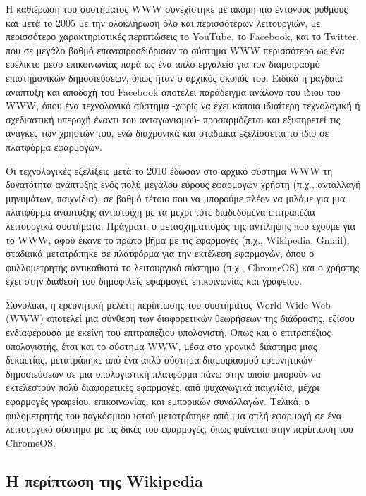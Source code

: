 \documentclass[
]{article}
\begin{document}
Η καθιέρωση του συστήματος WWW συνεχίστηκε με ακόμη πιο έντονους ρυθμούς
και μετά το 2005 με την ολοκλήρωση όλο και περισσότερων λειτουργιών, με
περισσότερο χαρακτηριστικές περιπτώσεις το YouTube, το Facebook, και το
Twitter, που σε μεγάλο βαθμό επαναπροσδιόρισαν το σύστημα WWW
περισσότερο ως ένα ευέλικτο μέσο επικοινωνίας παρά ως ένα απλό εργαλείο
για τον διαμοιρασμό επιστημονικών δημοσιεύσεων, όπως ήταν ο αρχικός
σκοπός του. Ειδικά η ραγδαία ανάπτυξη και αποδοχή του Facebook αποτελεί
παράδειγμα ανάλογο του ίδιου του WWW, όπου ένα τεχνολογικό σύστημα
-χωρίς να έχει κάποια ιδιαίτερη τεχνολογική ή σχεδιαστική υπεροχή έναντι
του ανταγωνισμού- προσαρμόζεται και εξυπηρετεί τις ανάγκες των χρηστών
του, ενώ διαχρονικά και σταδιακά εξελίσσεται το ίδιο σε πλατφόρμα
εφαρμογών.

Οι τεχνολογικές εξελίξεις μετά το 2010 έδωσαν στο αρχικό σύστημα WWW τη
δυνατότητα ανάπτυξης ενός πολύ μεγάλου εύρους εφαρμογών χρήστη (π.χ.,
ανταλλαγή μηνυμάτων, παιχνίδια), σε βαθμό τέτοιο που να μπορούμε πλέον
να μιλάμε για μια πλατφόρμα ανάπτυξης αντίστοιχη με τα μέχρι τότε
διαδεδομένα επιτραπέζια λειτουργικά συστήματα. Πράγματι, ο
μετασχηματισμός της αντίληψης που έχουμε για το WWW, αφού έκανε το πρώτο
βήμα με τις εφαρμογές (π.χ., Wikipedia, Gmail), σταδιακά μετατράπηκε σε
πλατφόρμα για την εκτέλεση εφαρμογών, όπου ο φυλλομετρητής αντικαθιστά
το λειτουργικό σύστημα (π.χ., ChromeOS) και ο χρήστης έχει στην διάθεσή
του δημοφιλείς εφαρμογές επικοινωνίας και γραφείου.

Συνολικά, η ερευνητική μελέτη περίπτωσης του συστήματος World Wide Web
(WWW) αποτελεί μια σύνθεση των διαφορετικών θεωρήσεων της διάδρασης,
εξίσου ενδιαφέρουσα με εκείνη του επιτραπέζιου υπολογιστή. Όπως και ο
επιτραπέζιος υπολογιστής, έτσι και το σύστημα WWW, μέσα στο χρονικό
διάστημα μιας δεκαετίας, μετατράπηκε από ένα απλό σύστημα διαμοιρασμού
ερευνητικών δημοσιεύσεων σε μια υπολογιστική πλατφόρμα πάνω στην οποία
μπορούν να εκτελεστούν πολύ διαφορετικές εφαρμογές, από ψυχαγωγικά
παιχνίδια, μέχρι εφαρμογές γραφείου, επικοινωνίας, και εμπορικών
συναλλαγών. Τελικά, ο φυλομετρητής του παγκόσμιου ιστού μετατράπηκε από
μια απλή εφαρμογή σε ένα λειτουργικό σύστημα με τις δικές του εφαρμογές,
όπως φαίνεται στην περίπτωση του ChromeOS.

\hypertarget{ux3b7-ux3c0ux3b5ux3c1ux3afux3c0ux3c4ux3c9ux3c3ux3b7-ux3c4ux3b7ux3c2-wikipedia}{%
\subsection{Η περίπτωση της
Wikipedia}\label{ux3b7-ux3c0ux3b5ux3c1ux3afux3c0ux3c4ux3c9ux3c3ux3b7-ux3c4ux3b7ux3c2-wikipedia}}
\end{document}
